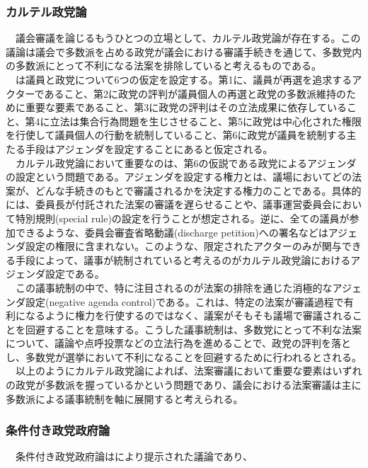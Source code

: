 \documentclass{article}
\begin{document}
\subsubsection{カルテル政党論}
　議会審議を論じるもうひとつの立場として、カルテル政党論\citep*{Cox2005-pn,Cox2007-xq}が存在する。この議論は議会で多数派を占める政党が議会における審議手続きを通じて、多数党内の多数派にとって不利になる法案を排除していると考えるものである。\\
　\citet*{Cox2005-pn,Cox2007-xq}は議員と政党について6つの仮定を設定する。第1に、議員が再選を追求するアクターであること、第2に政党の評判が議員個人の再選と政党の多数派維持のために重要な要素であること、第3に政党の評判はその立法成果に依存していること、第4に立法は集合行為問題を生じさせること、第5に政党は中心化された権限を行使して議員個人の行動を統制していること、第6に政党が議員を統制する主たる手段はアジェンダを設定することにあると仮定される。\\
　カルテル政党論において重要なのは、第6の仮説である政党によるアジェンダの設定という問題である。アジェンダを設定する権力とは、議場においてどの法案が、どんな手続きのもとで審議されるかを決定する権力のことである。具体的には、委員長が付託された法案の審議を遅らせることや、議事運営委員会において特別規則(special rule)の設定を行うことが想定される。逆に、全ての議員が参加できるような、委員会審査省略動議(discharge petition)への署名などはアジェンダ設定の権限に含まれない。このような、限定されたアクターのみが関与できる手段によって、議事が統制されていると考えるのがカルテル政党論におけるアジェンダ設定である。\\
　この議事統制の中で、特に注目されるのが法案の排除を通じた消極的なアジェンダ設定(negative agenda control)である。これは、特定の法案が審議過程で有利になるように権力を行使するのではなく、議案がそもそも議場で審議されることを回避することを意味する。こうした議事統制は、多数党にとって不利な法案について、議論や点呼投票などの立法行為を進めることで、政党の評判を落とし、多数党が選挙において不利になることを回避するために行われるとされる。\\
　以上のようにカルテル政党論によれば、法案審議において重要な要素はいずれの政党が多数派を握っているかという問題であり、議会における法案審議は主に多数派による議事統制を軸に展開すると考えられる。

\subsubsection{条件付き政党政府論}
　条件付き政党政府論は\citet*{Aldrich1995-xf}により提示された議論であり、
\end{document}
